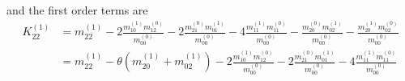 and the first order terms are
\begin{equation}
  \begin{aligned}
    K_{22}^{(1)}
    & = m_{22}^{(1)}
      - 2\frac{ m_{10}^{(1)} m_{12}^{(0)} }{m_{00}^{(0)}}
      - 2\frac{ m_{21}^{(0)} m_{01}^{(1)} }{m_{00}^{(0)}}
      - 4\frac{ m_{11}^{(1)} m_{11}^{(0)} }{m_{00}^{(0)}}
      - \frac{ m_{20}^{(0)} m_{02}^{(1)} }{m_{00}^{(0)}}
      - \frac{ m_{20}^{(1)} m_{02}^{(0)} }{m_{00}^{(0)}}
    \\& = m_{22}^{(1)}
      - \theta (m_{20}^{(1)} + m_{02}^{(1)})
      - 2\frac{ m_{10}^{(1)} m_{12}^{(0)} }{m_{00}^{(0)}}
      - 2\frac{ m_{21}^{(0)} m_{01}^{(1)} }{m_{00}^{(0)}}
      - 4\frac{ m_{11}^{(1)} m_{11}^{(0)} }{m_{00}^{(0)}}
  \end{aligned}
 \end{equation}
